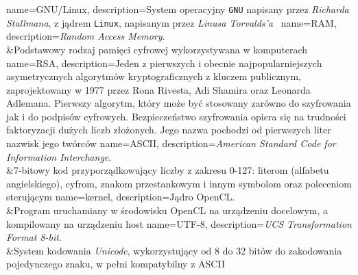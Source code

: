 %
%

{
	name={GNU/Linux},
	description={System operacyjny \texttt{GNU} napisany przez \emph{Richarda Stallmana}, z jądrem \texttt{Linux}, napisanym przez \emph{Linusa Torvalds'a}~\cite{gnulinux}}
}
{
	name={RAM},
	description={\textit{Random Access Memory}.\\&Podstawowy  rodzaj  pamięci  cyfrowej
   wykorzystywana w komputerach}
}
{
	name={RSA},
	description={Jeden z pierwszych i obecnie najpopularniejszych asymetrycznych algorytmów kryptograficznych z kluczem publicznym, zaprojektowany w 1977 przez Rona Rivesta, Adi Shamira oraz Leonarda Adlemana. Pierwszy algorytm, który może być stosowany zarówno do szyfrowania jak i do podpisów cyfrowych. Bezpieczeństwo szyfrowania opiera się na trudności faktoryzacji dużych liczb złożonych. Jego nazwa pochodzi od pierwszych liter nazwisk jego twórców}
}
{
	name={ASCII},
	description={\textit{American Standard Code for Information Interchange}.\\&7-bitowy kod przyporządkowujący liczby z zakresu 0-127: literom (alfabetu angielskiego), cyfrom, znakom przestankowym i innym symbolom oraz poleceniom sterującym}
}
{
	name={kernel},
	description={Jądro \gls{OpenCL}.\\&Program uruchamiany w środowisku OpenCL na urządzeniu docelowym, a kompilowany na urządzeniu host}
}
{
	name={UTF-8},
	description={\textit{UCS Transformation Format 8-bit}.\\&System kodowania \emph{Unicode}, wykorzystujący od 8 do 32 bitów do zakodowania pojedynczego znaku, w pełni kompatybilny z \gls{ASCII}}
}
